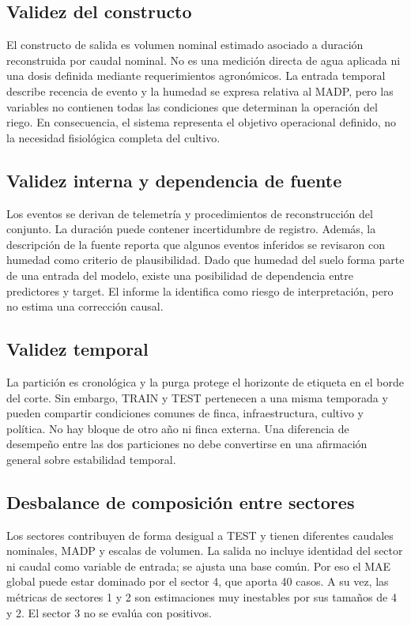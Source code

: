 \documentclass[11pt,letterpaper]{article}
\begin{document}
\subsection{Validez del constructo}
El constructo de salida es volumen nominal estimado asociado a duración reconstruida por caudal nominal. No es una medición directa de agua aplicada ni una dosis definida mediante requerimientos agronómicos. La entrada temporal describe recencia de evento y la humedad se expresa relativa al MADP, pero las variables no contienen todas las condiciones que determinan la operación del riego. En consecuencia, el sistema representa el objetivo operacional definido, no la necesidad fisiológica completa del cultivo.

\subsection{Validez interna y dependencia de fuente}
Los eventos se derivan de telemetría y procedimientos de reconstrucción del conjunto. La duración puede contener incertidumbre de registro. Además, la descripción de la fuente reporta que algunos eventos inferidos se revisaron con humedad como criterio de plausibilidad. Dado que humedad del suelo forma parte de una entrada del modelo, existe una posibilidad de dependencia entre predictores y target. El informe la identifica como riesgo de interpretación, pero no estima una corrección causal.

\subsection{Validez temporal}
La partición es cronológica y la purga protege el horizonte de etiqueta en el borde del corte. Sin embargo, TRAIN y TEST pertenecen a una misma temporada y pueden compartir condiciones comunes de finca, infraestructura, cultivo y política. No hay bloque de otro año ni finca externa. Una diferencia de desempeño entre las dos particiones no debe convertirse en una afirmación general sobre estabilidad temporal.

\subsection{Desbalance de composición entre sectores}
Los sectores contribuyen de forma desigual a TEST y tienen diferentes caudales nominales, MADP y escalas de volumen. La salida no incluye identidad del sector ni caudal como variable de entrada; se ajusta una base común. Por eso el MAE global puede estar dominado por el sector 4, que aporta 40 casos. A su vez, las métricas de sectores 1 y 2 son estimaciones muy inestables por sus tamaños de 4 y 2. El sector 3 no se evalúa con positivos.
\end{document}

